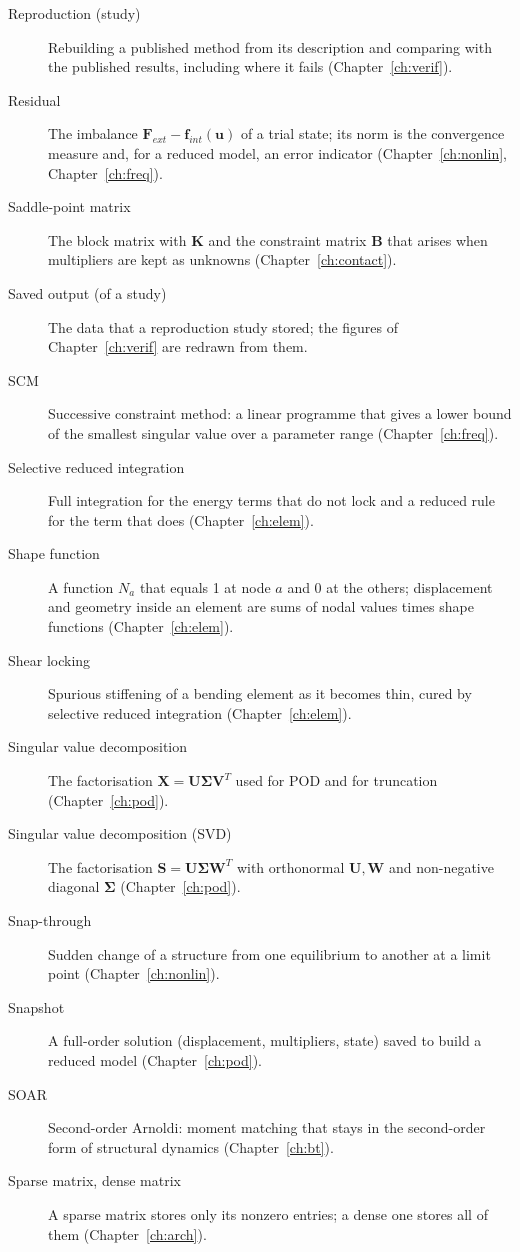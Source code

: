 \begin{description}
\item[Reproduction (study)] Rebuilding a published method from its description and comparing with the published results, including where it fails (Chapter~\ref{ch:verif}).
\item[Residual] The imbalance $\bm F_{ext}-\bm f_{int}(\bm u)$ of a trial state; its norm is the convergence measure and, for a reduced model, an error indicator (Chapter~\ref{ch:nonlin}, Chapter~\ref{ch:freq}).
\item[Saddle-point matrix] The block matrix with $\bm K$ and the constraint matrix $\bm B$ that arises when multipliers are kept as unknowns (Chapter~\ref{ch:contact}).
\item[Saved output (of a study)] The data that a reproduction study stored; the figures of Chapter~\ref{ch:verif} are redrawn from them.
\item[SCM] Successive constraint method: a linear programme that gives a lower bound of the smallest singular value over a parameter range (Chapter~\ref{ch:freq}).
\item[Selective reduced integration] Full integration for the energy terms that do not lock and a reduced rule for the term that does (Chapter~\ref{ch:elem}).
\item[Shape function] A function $N_a$ that equals 1 at node $a$ and 0 at the others; displacement and geometry inside an element are sums of nodal values times shape functions (Chapter~\ref{ch:elem}).
\item[Shear locking] Spurious stiffening of a bending element as it becomes thin, cured by selective reduced integration (Chapter~\ref{ch:elem}).
\item[Singular value decomposition] The factorisation $\bm X=\bm U\bm\Sigma\bm V^T$ used for POD and for truncation (Chapter~\ref{ch:pod}).
\item[Singular value decomposition (SVD)] The factorisation $\bm S=\bm U\bm\Sigma\bm W^T$ with orthonormal $\bm U,\bm W$ and non-negative diagonal $\bm\Sigma$ (Chapter~\ref{ch:pod}).
\item[Snap-through] Sudden change of a structure from one equilibrium to another at a limit point (Chapter~\ref{ch:nonlin}).
\item[Snapshot] A full-order solution (displacement, multipliers, state) saved to build a reduced model (Chapter~\ref{ch:pod}).
\item[SOAR] Second-order Arnoldi: moment matching that stays in the second-order form of structural dynamics (Chapter~\ref{ch:bt}).
\item[Sparse matrix, dense matrix] A sparse matrix stores only its nonzero entries; a dense one stores all of them (Chapter~\ref{ch:arch}).

\end{description}
